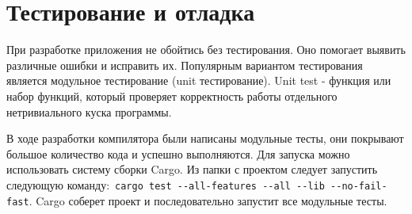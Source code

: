 \chapter{Тестирование и отладка}
\label{ch:chap4_soft_testing}

При разработке приложения не обойтись без тестирования.
Оно помогает выявить различные ошибки и исправить их.
Популярным вариантом тестирования является модульное тестирование (unit тестирование).
Unit test - функция или набор функций, который проверяет корректность работы отдельного нетривиального куска программы.

В ходе разработки компилятора были написаны модульные тесты, они покрывают большое количество кода и успешно выполняются.
Для запуска можно использовать систему сборки Cargo.
Из папки с проектом следует запустить следующую команду:~\lstinline{cargo test --all-features --all --lib --no-fail-fast}.
Cargo соберет проект и последовательно запустит все модульные тесты.



